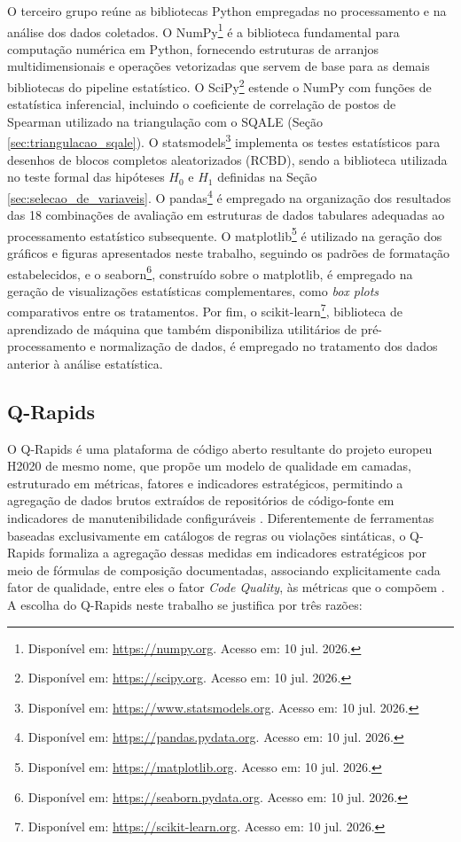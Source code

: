 O terceiro grupo reúne as bibliotecas Python empregadas no processamento e na análise dos dados coletados. O NumPy\footnote{Disponível em: \url{https://numpy.org}. Acesso em: 10 jul. 2026.} é a biblioteca fundamental para computação numérica em Python, fornecendo estruturas de arranjos multidimensionais e operações vetorizadas que servem de base para as demais bibliotecas do pipeline estatístico. O SciPy\footnote{Disponível em: \url{https://scipy.org}. Acesso em: 10 jul. 2026.} estende o NumPy com funções de estatística inferencial, incluindo o coeficiente de correlação de postos de Spearman utilizado na triangulação com o SQALE (Seção \ref{sec:triangulacao_sqale}). O statsmodels\footnote{Disponível em: \url{https://www.statsmodels.org}. Acesso em: 10 jul. 2026.} implementa os testes estatísticos para desenhos de blocos completos aleatorizados (RCBD), sendo a biblioteca utilizada no teste formal das hipóteses $H_0$ e $H_1$ definidas na Seção \ref{sec:selecao_de_variaveis}. O pandas\footnote{Disponível em: \url{https://pandas.pydata.org}. Acesso em: 10 jul. 2026.} é empregado na organização dos resultados das 18 combinações de avaliação em estruturas de dados tabulares adequadas ao processamento estatístico subsequente. O matplotlib\footnote{Disponível em: \url{https://matplotlib.org}. Acesso em: 10 jul. 2026.} é utilizado na geração dos gráficos e figuras apresentados neste trabalho, seguindo os padrões de formatação estabelecidos, e o seaborn\footnote{Disponível em: \url{https://seaborn.pydata.org}. Acesso em: 10 jul. 2026.}, construído sobre o matplotlib, é empregado na geração de visualizações estatísticas complementares, como \textit{box plots} comparativos entre os tratamentos. Por fim, o scikit-learn\footnote{Disponível em: \url{https://scikit-learn.org}. Acesso em: 10 jul. 2026.}, biblioteca de aprendizado de máquina que também disponibiliza utilitários de pré-processamento e normalização de dados, é empregado no tratamento dos dados anterior à análise estatística.

\subsection{Q-Rapids}
\label{sec:qrapids_justificativa}

O Q-Rapids é uma plataforma de código aberto resultante do projeto europeu H2020 de mesmo nome, que propõe um modelo de qualidade em camadas, estruturado em métricas, fatores e indicadores estratégicos, permitindo a agregação de dados brutos extraídos de repositórios de código-fonte em indicadores de manutenibilidade configuráveis . Diferentemente de ferramentas baseadas exclusivamente em catálogos de regras ou violações sintáticas, o Q-Rapids formaliza a agregação dessas medidas em indicadores estratégicos por meio de fórmulas de composição documentadas, associando explicitamente cada fator de qualidade, entre eles o fator \textit{Code Quality}, às métricas que o compõem \cite{qrapids2019}. A escolha do Q-Rapids neste trabalho se justifica por três razões:

